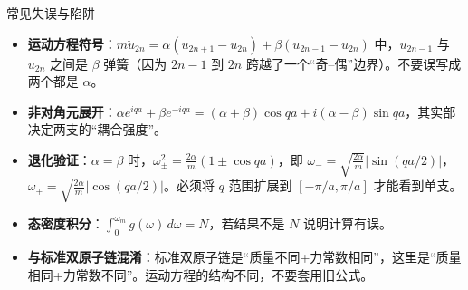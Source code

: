 \begin{errorbox}{常见失误与陷阱}
\begin{itemize}
    \item \textbf{运动方程符号}：$m\ddot{u}_{2n}=\alpha(u_{2n+1}-u_{2n})+\beta(u_{2n-1}-u_{2n})$ 中，$u_{2n-1}$ 与 $u_{2n}$ 之间是 $\beta$ 弹簧（因为 $2n-1$ 到 $2n$ 跨越了一个``奇--偶''边界）。不要误写成两个都是 $\alpha$。
    \item \textbf{非对角元展开}：$\alpha e^{iqa}+\beta e^{-iqa}=(\alpha+\beta)\cos qa+i(\alpha-\beta)\sin qa$，其实部决定两支的``耦合强度''。
    \item \textbf{退化验证}：$\alpha=\beta$ 时，$\omega_{\pm}^2=\frac{2\alpha}{m}(1\pm\cos qa)$，即 $\omega_{-}=\sqrt{\frac{2\alpha}{m}}|\sin(qa/2)|$，$\omega_{+}=\sqrt{\frac{2\alpha}{m}}|\cos(qa/2)|$。必须将 $q$ 范围扩展到 $[-\pi/a,\pi/a]$ 才能看到单支。
    \item \textbf{态密度积分}：$\int_0^{\omega_m}g(\omega)\,d\omega=N$，若结果不是 $N$ 说明计算有误。
    \item \textbf{与标准双原子链混淆}：标准双原子链是``质量不同+力常数相同''，这里是``质量相同+力常数不同''。运动方程的结构不同，不要套用旧公式。
\end{itemize}
\end{errorbox}

